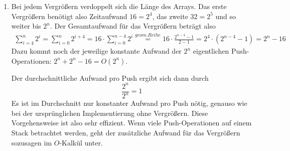 \documentclass[11pt,a4paper]{article}
\begin{document}
\begin{loesung}
\begin{enumerate}
\begin{enumerate}[label=(\roman*)]
            \item
            Bei jedem Vergrößern verdoppelt sich die Länge des Arrays.
            Das erste Vergrößern benötigt also Zeitaufwand $16 = 2^4$, das zweite $32 = 2^5$ und so weiter bis $2^n$.
            Der Gesamtaufwand für das Vergrößern beträgt also
            \begin{align*}
                \sum\limits_{i=4}^{n} 2^i
                =\sum\limits_{i=0}^{n} 2^{i + 4}
                = 16 \cdot \sum\limits_{i=0}^{n-4} 2^i
                \overset{geom. Reihe}{=} 16 \cdot \frac{2^{n-4} - 1}{2 - 1} = 2^4 \cdot \left(2^{n - 4} - 1\right)
                = 2^n - 16
            \end{align*}
            Dazu kommt noch der jeweilige konstante Aufwand der $2^n$ eigentlichen Push-Operationen: $2^n + 2^n - 16 = O\left(2^n\right)$.

            Der durchschnittliche Aufwand pro Push ergibt sich dann durch
            \begin{equation*}
                \frac{2^n}{2^n} = 1
            \end{equation*}
            Es ist im Durchschnitt nur konstanter Aufwand pro Push nötig, genauso wie bei der ursprünglichen Implementierung ohne Vergrößern.
            Diese Vorgehensweise ist also sehr effizient.
            Wenn viele Push-Ope\-ra\-tio\-nen auf einem Stack betrachtet werden, geht der zusätzliche Aufwand für das Vergrößern sozusagen im $O$-Kalkül unter.
        \end{enumerate}
    \end{enumerate}
\end{loesung}
\end{document}
